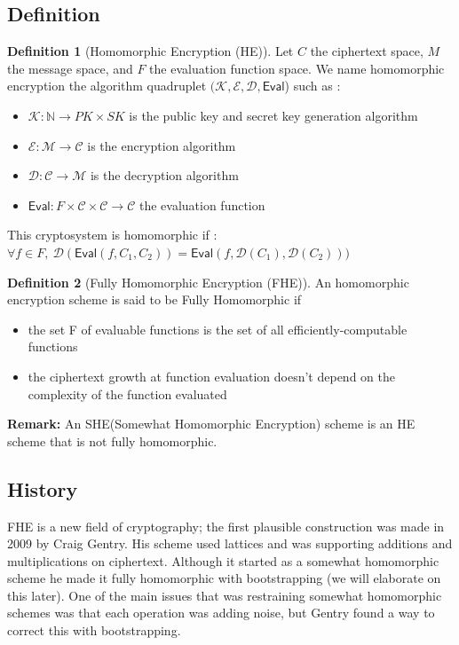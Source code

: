 \documentclass{article}
\newcommand{\N}{\mathbb{N}}
\theoremstyle{definition}
\newtheorem{definition}{Definition}[section]
\theoremstyle{Theorem}
\begin{document}
\subsection{Definition}
\begin{definition}[Homomorphic Encryption (HE)]
    Let  $C$ the ciphertext space, $M$ the message space, and $F$ the evaluation function space. We name homomorphic encryption the algorithm quadruplet $(\mathcal K, \mathcal E, \mathcal D, \mathsf{Eval}$) such as :

    \begin{itemize}
        \item $\mathcal K : \N \to PK \times SK$ is the public key and secret key generation algorithm
        \item $\mathcal{E} : \mathcal M \to \mathcal C$ is the encryption algorithm
        \item $\mathcal{D} : \mathcal C \to \mathcal M$ is the decryption algorithm
        \item $\mathsf{Eval} : F \times \mathcal C \times \mathcal C \to \mathcal C$ the evaluation function
    \end{itemize}

    This cryptosystem is homomorphic if : $\forall f \in F,~ \mathcal{D}(\mathsf{Eval}(f, C_1, C_2)) = \mathsf{Eval}(f, \mathcal{D}(C_1), \mathcal{D}(C_2)))$
\end{definition}
\begin{definition}[Fully Homomorphic Encryption (FHE)]
    An homomorphic encryption scheme is said to be Fully Homomorphic if 
    \begin{itemize}
        \item the set F of evaluable functions is the set of all efficiently-computable functions
        \item the ciphertext growth at function evaluation doesn't depend on the complexity of the function evaluated
    \end{itemize}
\end{definition}

\textbf{Remark: }
An SHE(Somewhat Homomorphic Encryption) scheme is an HE scheme that is not fully homomorphic. 

\subsection{History}

FHE is a new field of cryptography; the first plausible construction was made in 2009 by Craig Gentry. His scheme used lattices and was supporting additions and multiplications on ciphertext. Although it started as a somewhat homomorphic scheme he made it fully homomorphic with bootstrapping (we will elaborate on this later). One of the main issues that was restraining somewhat homomorphic schemes was that each operation was adding noise, but Gentry found a way to correct this with bootstrapping.
\end{document}
